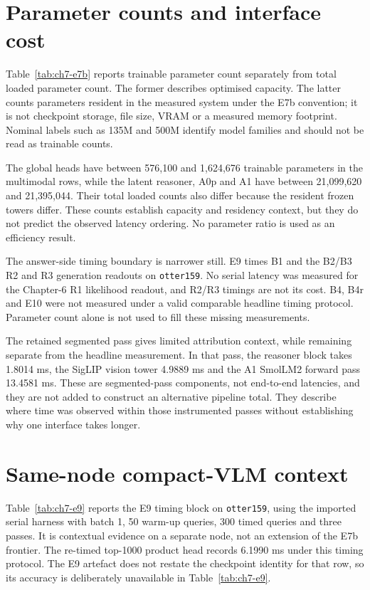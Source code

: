 \section{Parameter counts and interface cost}
\label{sec:ch7-parameters}

Table~\ref{tab:ch7-e7b} reports trainable parameter count separately from total
loaded parameter count. The former describes optimised capacity. The latter
counts parameters resident in the measured system under the E7b convention;
it is not checkpoint storage, file size, VRAM or a measured memory footprint.
Nominal labels such as 135M and 500M identify model families and should not be
read as trainable counts.

The global heads have between 576,100 and 1,624,676 trainable parameters in
the multimodal rows, while the latent reasoner, A0p and A1 have between
21,099,620 and 21,395,044. Their total loaded counts also differ because the
resident frozen towers differ. These counts establish capacity and residency
context, but they do not predict the observed latency ordering. No parameter
ratio is used as an efficiency result.

The answer-side timing boundary is narrower still. E9 times B1 and the B2/B3
R2 and R3 generation readouts on \texttt{otter159}. No serial latency was
measured for the Chapter-6 R1 likelihood readout, and R2/R3 timings are not its
cost. B4, B4r and E10 were not measured under a valid comparable headline
timing protocol. Parameter count alone is not used to fill these missing
measurements.

The retained segmented pass gives limited attribution context, while remaining
separate from the headline measurement. In that pass, the reasoner block takes
1.8014 ms, the SigLIP vision tower 4.9889 ms and the A1 SmolLM2 forward pass
13.4581 ms. These are segmented-pass components, not end-to-end latencies, and
they are not added to construct an alternative pipeline total. They describe
where time was observed within those instrumented passes without establishing
why one interface takes longer.

\section{Same-node compact-VLM context}
\label{sec:ch7-vlm}

Table~\ref{tab:ch7-e9} reports the E9 timing block on \texttt{otter159}, using
the imported serial harness with batch 1, 50 warm-up queries, 300 timed queries
and three passes. It is contextual evidence on a separate node, not an
extension of the E7b frontier. The re-timed top-1000 product head records
6.1990 ms under this timing protocol. The E9 artefact does not restate the
checkpoint identity for that row, so its accuracy is deliberately unavailable
in Table~\ref{tab:ch7-e9}.

